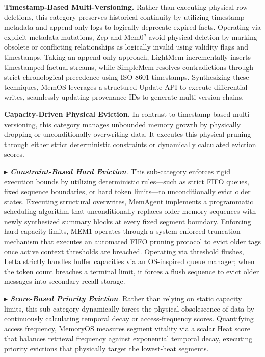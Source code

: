 \documentclass{llmxive}
\begin{document}
\noindent  \textbf{Timestamp-Based Multi-Versioning.}
Rather than executing physical row deletions, this category preserves historical continuity by utilizing timestamp metadata and append-only logs to logically deprecate expired facts.
Operating via explicit metadata mutations, Zep and $\text{Mem0}^g$ avoid physical deletion by marking obsolete or conflicting relationships as logically invalid using validity flags and timestamps.
Taking an append-only approach, LightMem incrementally inserts timestamped factual streams, while SimpleMem resolves contradictions through strict chronological precedence using ISO-8601 timestamps.
Synthesizing these techniques, MemOS leverages a structured Update API to execute differential writes, seamlessly updating provenance IDs to generate multi-version chains.

\noindent  \textbf{Capacity-Driven Physical Eviction.}
In contrast to timestamp-based multi-versioning, this category manages unbounded memory growth by physically dropping or unconditionally overwriting data.
It executes this physical pruning through either strict deterministic constraints or dynamically calculated eviction scores.

\noindent \underline{\textit{$\blacktriangleright$ \textbf{Constraint-Based Hard Eviction}.}}
This sub-category enforces rigid execution bounds by utilizing deterministic rules—such as strict FIFO queues, fixed sequence boundaries, or hard token limits—to unconditionally evict older states.
Executing structural overwrites, MemAgent implements a programmatic scheduling algorithm that unconditionally replaces older memory sequences with newly synthesized summary blocks at every fixed segment boundary. Enforcing hard capacity limits, MEM1 operates through a system-enforced truncation mechanism that executes an automated FIFO pruning protocol to evict older tags once active context thresholds are breached. Operating via threshold flushes, Letta strictly handles buffer capacities via an OS-inspired queue manager; when the token count breaches a terminal limit, it forces a flush sequence to evict older messages into secondary recall storage.

\noindent \underline{\textit{$\blacktriangleright$ \textbf{Score-Based Priority Eviction}.}}
Rather than relying on static capacity limits, this sub-category dynamically forces the physical obsolescence of data by continuously calculating temporal decay or access-frequency scores.
Quantifying access frequency, MemoryOS measures segment vitality via a scalar Heat score that balances retrieval frequency against exponential temporal decay, executing priority evictions that physically target the lowest-heat segments.
\end{document}
